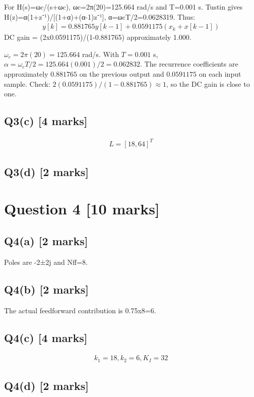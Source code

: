 \documentclass[11pt,a4paper]{article}
\begin{document}
For H(s)=ωc/(s+ωc), ωc=2π(20)=125.664 rad/s and T=0.001 s.
Tustin gives H(z)=α(1+z⁻¹)/[(1+α)+(α-1)z⁻¹], α=ωcT/2=0.0628319.
Thus:\[\begin{aligned}y[k]=0.881765y[k-1]+0.0591175(x_k+x[k-1])\end{aligned}\]
DC gain = (2x0.0591175)/(1-0.881765) approximately 1.000.\par\smallskip $\omega_c=2\pi(20)=125.664$ rad/s. With $T=0.001$ s, $\alpha=\omega_cT/2=125.664(0.001)/2=0.062832$. The recurrence coefficients are approximately $0.881765$ on the previous output and $0.0591175$ on each input sample. Check: $2(0.0591175)/(1-0.881765)\approx1$, so the DC gain is close to one.

\subsection*{Q3(c) \hfill [4 marks]}

\[\begin{aligned}L = [18,64]^T\end{aligned}\]

\subsection*{Q3(d) \hfill [2 marks]}

\vspace{2mm}

\section*{Question 4 \hfill [10 marks]}
\subsection*{Q4(a) \hfill [2 marks]}

Poles are -2±2j and Nff=8.

\subsection*{Q4(b) \hfill [2 marks]}

The actual feedforward contribution is 0.75x8=6.

\subsection*{Q4(c) \hfill [4 marks]}

\[\begin{aligned}k_1=18, k_2=6, K_I=32\end{aligned}\]

\subsection*{Q4(d) \hfill [2 marks]}

\vspace{2mm}
\end{document}
